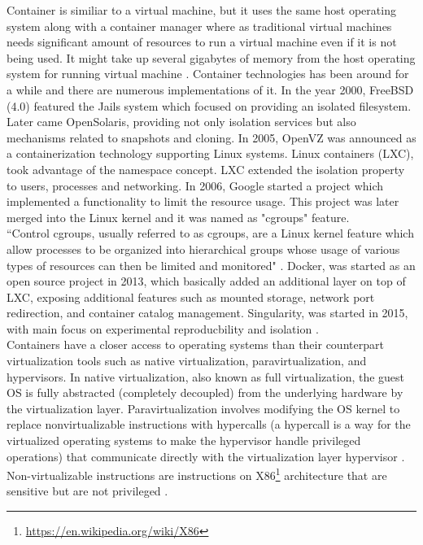 Container is similiar to a virtual machine, but it uses the same host operating system along with a container manager where as traditional virtual machines needs significant amount of resources to run a virtual machine even if it is not being used. It might take up several gigabytes of memory from the host operating system for running virtual machine \cite{DBLP:journals/corr/HaleLRW16}. Container technologies has been around for a while and there are numerous implementations of it. In the year 2000, FreeBSD (4.0) featured the Jails system which focused on providing an isolated filesystem. Later came OpenSolaris, providing not only isolation services but also mechanisms related to snapshots and cloning. In 2005, OpenVZ was announced as a containerization technology supporting Linux systems. Linux containers (LXC), took advantage of the namespace concept. LXC extended the isolation property to users, processes and networking. In 2006, Google started a project which implemented a functionality to limit the resource usage. This project was later merged into the Linux kernel and it was named as "cgroups" feature. \\
 
``Control cgroups, usually referred to as cgroups, are a Linux kernel feature which allow processes to be organized into hierarchical groups whose usage of various types of resources can then be limited and monitored" \cite{cgroups}. Docker, was started as an open source project in 2013, which basically added an additional layer on top of LXC, exposing additional features such as mounted storage, network port redirection, and container catalog management. Singularity, was started in 2015, with main focus on experimental reproducbility and isolation \cite{Xavier:2013:PEC:2497369.2497577}.\\ 

Containers have a closer access to operating systems than their counterpart virtualization tools such as native virtualization, paravirtualization, and hypervisors. In native virtualization, also known as full virtualization, the guest OS is fully abstracted (completely decoupled) from the underlying hardware by the virtualization layer. Paravirtualization involves modifying the OS kernel to replace nonvirtualizable instructions with hypercalls (a hypercall is a way for the virtualized operating systems to make the hypervisor handle privileged operations) that communicate directly with the virtualization layer hypervisor \cite{citeulike:11530382}. Non-virtualizable instructions are instructions on X86\footnote{\url{https://en.wikipedia.org/wiki/X86}} architecture that are sensitive but are not privileged \cite{non-virtualizable-commands}.\\ 

